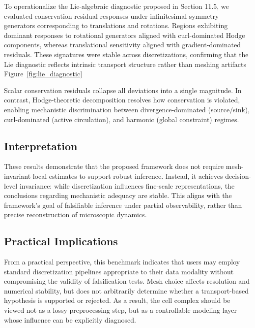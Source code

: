 \documentclass[10pt,article]{article}
\begin{document}
To operationalize the Lie-algebraic diagnostic proposed in Section 11.5, we evaluated conservation residual responses under infinitesimal symmetry generators corresponding to translations and rotations. Regions exhibiting dominant responses to rotational generators aligned with curl-dominated Hodge components, whereas translational sensitivity aligned with gradient-dominated residuals. These signatures were stable across discretizations, confirming that the Lie diagnostic reflects intrinsic transport structure rather than meshing artifacts Figure~\ref{fig:lie_diagnostic}

Scalar conservation residuals collapse all deviations into a single magnitude. In contrast, Hodge-theoretic decomposition resolves how conservation is violated, enabling mechanistic discrimination between divergence-dominated (source/sink), curl-dominated (active circulation), and harmonic (global constraint) regimes.


\subsection{Interpretation}

These results demonstrate that the proposed framework does not require mesh-invariant local estimates to support robust inference. Instead, it achieves decision-level invariance: while discretization influences fine-scale representations, the conclusions regarding mechanistic adequacy are stable. This aligns with the framework’s goal of falsifiable inference under partial observability, rather than precise reconstruction of microscopic dynamics.

\subsection{Practical Implications}

From a practical perspective, this benchmark indicates that users may employ standard discretization pipelines appropriate to their data modality without compromising the validity of falsification tests. Mesh choice affects resolution and numerical stability, but does not arbitrarily determine whether a transport-based hypothesis is supported or rejected. As a result, the cell complex should be viewed not as a lossy preprocessing step, but as a controllable modeling layer whose influence can be explicitly diagnosed.
\end{document}

